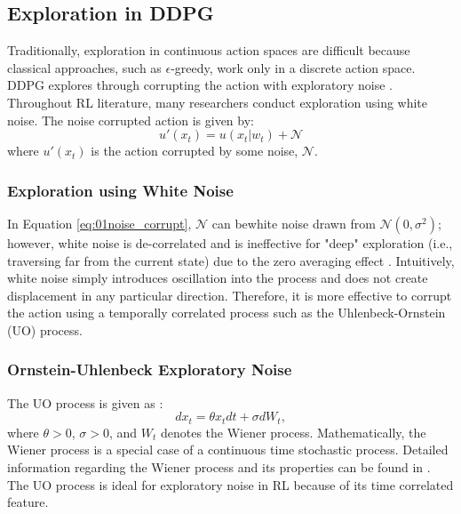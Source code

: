 \newpage

\subsection{Exploration in DDPG}
Traditionally, exploration in continuous action spaces are difficult because classical approaches, such as $\epsilon$-greedy, work only in a discrete action space.  DDPG explores through corrupting the action with exploratory noise \cite{ddpg}.  Throughout RL literature, many researchers conduct exploration using white noise. The noise corrupted action is given by:
\begin{equation}
    u'(x_t) = u(x_t|w_t) + \mathcal{N}
    \label{eq:01noise_corrupt}
\end{equation}
where $u'(x_t)$ is the action corrupted by some noise, $\mathcal{N}$.

\subsubsection{Exploration using White Noise}
In Equation \ref{eq:01noise_corrupt}, $\mathcal{N}$ can bewhite noise drawn from $\mathcal{N}(0, \sigma^2)$; however, white noise is de-correlated and is ineffective for "deep" exploration (i.e., traversing far from the current state) due to the zero averaging effect \cite{white_noise}. Intuitively, white noise simply introduces oscillation into the process and does not create displacement in any particular direction. Therefore, it is more effective to corrupt the action using a temporally correlated process such as the Uhlenbeck-Ornstein (UO) process.

\subsubsection{Ornstein-Uhlenbeck Exploratory Noise}

The UO process is given as \cite{ornstein}:
\begin{equation}
    dx_t = \theta x_t dt + \sigma dW_t,
\end{equation}
where $\theta > 0$, $\sigma > 0$, and $W_t$ denotes the Wiener process. Mathematically, the Wiener process is a special case of a continuous time stochastic process. Detailed information regarding the Wiener process and its properties can be found in \cite{wiener}. The UO process is ideal for exploratory noise in RL because of its time correlated feature.

